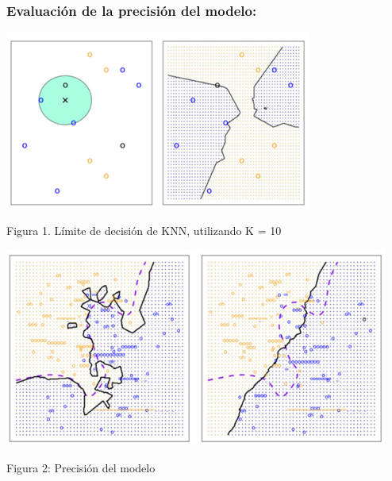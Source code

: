 \documentclass[
  letterpaper,
  DIV=11,
  numbers=noendperiod]{scrartcl}
\begin{document}
\hypertarget{evaluaciuxf3n-de-la-precisiuxf3n-del-modelo-1}{%
\subsubsection{\texorpdfstring{\textbf{Evaluación de la precisión del
modelo:}}{Evaluación de la precisión del modelo:}}\label{evaluaciuxf3n-de-la-precisiuxf3n-del-modelo-1}}

\begin{Figura 1. Límite de decisión de KNN, utilizando K = 10}

{\centering \includegraphics{cap10.png}

}

\caption{Figura 1. Límite de decisión de KNN, utilizando K = 10}

\end{Figura 1. Límite de decisión de KNN, utilizando K = 10}

\begin{Figura 2: Precisión del modelo}

{\centering \includegraphics{cap11.png}

}

\caption{Figura 2: Precisión del modelo}

\end{Figura 2: Precisión del modelo}
\end{document}
